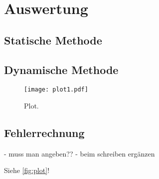 \section{Auswertung}
\label{sec:Auswertung}

\subsection{Statische Methode}
\label{Statische Methode}






\subsection{Dynamische Methode}
\label{Dynamische Methode}




\begin{figure}
  \centering
  \texttt{[image: plot1.pdf]}
  \caption{Plot.}
  \label{fig:plot}
\end{figure}

\subsection{Fehlerrechnung}
\label{Fehlerrechnung}

- muss man angeben??
- beim schreiben ergänzen


Siehe \autoref{fig:plot}!
